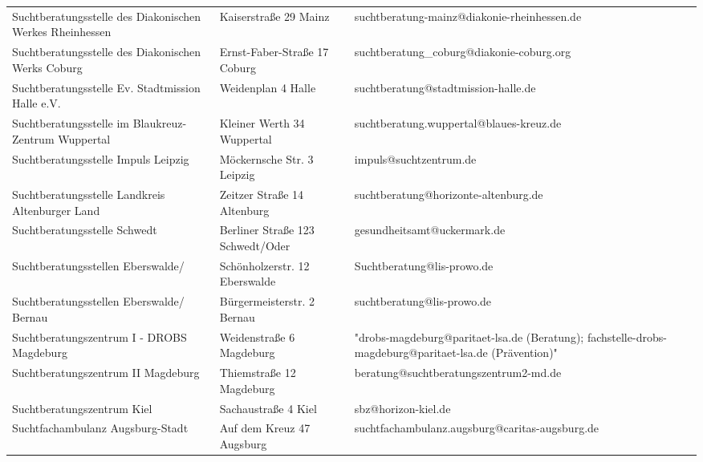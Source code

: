 {\begin{xltabular}{\textwidth} {
 >{\raggedright\arraybackslash}p{5cm}
 >{\raggedright\arraybackslash}X
 >{\raggedright\arraybackslash}p{5cm} }
Suchtberatungsstelle des Diakonischen Werkes Rheinhessen & Kaiserstraße 29 Mainz & suchtberatung-mainz@diakonie-rheinhessen.de \\
Suchtberatungsstelle des Diakonischen Werks Coburg & Ernst-Faber-Straße 17 Coburg & suchtberatung\_coburg@diakonie-coburg.org \\
Suchtberatungsstelle Ev. Stadtmission Halle e.V. & Weidenplan 4 Halle & suchtberatung@stadtmission-halle.de \\
Suchtberatungsstelle im Blaukreuz-Zentrum Wuppertal & Kleiner Werth 34 Wuppertal & suchtberatung.wuppertal@blaues-kreuz.de \\
Suchtberatungsstelle Impuls Leipzig & Möckernsche Str. 3 Leipzig & impuls@suchtzentrum.de \\
Suchtberatungsstelle Landkreis Altenburger Land & Zeitzer Straße 14 Altenburg & suchtberatung@horizonte-altenburg.de \\
Suchtberatungsstelle Schwedt & Berliner Straße 123 Schwedt/Oder & gesundheitsamt@uckermark.de \\
Suchtberatungsstellen Eberswalde/ & Schönholzerstr. 12 Eberswalde & Suchtberatung@lis-prowo.de \\
Suchtberatungsstellen Eberswalde/ Bernau & Bürgermeisterstr. 2 Bernau & suchtberatung@lis-prowo.de \\
Suchtberatungszentrum I - DROBS Magdeburg & Weidenstraße 6 Magdeburg & "drobs-magdeburg@paritaet-lsa.de (Beratung); fachstelle-drobs-magdeburg@paritaet-lsa.de (Prävention)" \\
Suchtberatungszentrum II Magdeburg & Thiemstraße 12 Magdeburg & beratung@suchtberatungszentrum2-md.de \\
Suchtberatungszentrum Kiel & Sachaustraße 4 Kiel & sbz@horizon-kiel.de \\
Suchtfachambulanz Augsburg-Stadt & Auf dem Kreuz 47 Augsburg & suchtfachambulanz.augsburg@caritas-augsburg.de \\

\end{xltabular}}
